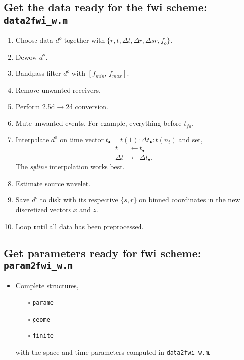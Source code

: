 \documentclass[a4paper,12pt]{article}
\begin{document}
\subsection*{Get the data ready for the fwi scheme: \texttt{data2fwi\_w.m}}
\begin{enumerate}
\item Choose data $d^o$ together with $\{r,t,\Delta t,\Delta r,\Delta sr, f_o\}$.
\item Dewow $d^o$.
\item Bandpass filter $d^o$ with $[f_{min},\, f_{max}]$.
\item Remove unwanted receivers.
\item Perform 2.5d$\to$2d conversion.
\item Mute unwanted events. For example, everything before $t_{fa}$.
\item Interpolate $d^o$ on time vector $t_\bullet=t(1):\Delta t_\bullet:t(n_t)$ and set,
\begin{align}
t &\gets t_\bullet \\
 \Delta t &\gets \Delta t_\bullet.
\end{align}
The {\it spline} interpolation works best.
\item Estimate source wavelet.
\item Save $d^o$ to disk with its respective $\{s,r\}$ on binned coordinates in the new discretized vectors $x$ and $z$.
\item Loop until all data has been preprocessed.
\end{enumerate}
%
\subsection*{Get parameters ready for fwi scheme: \texttt{param2fwi\_w.m}}
\begin{itemize}
\item Complete structures,
\begin{itemize}
\item[$\circ$] \texttt{parame\_}
\item[$\circ$] \texttt{geome\_}
\item[$\circ$] \texttt{finite\_}
\end{itemize}
with the space and time parameters computed in \texttt{data2fwi\_w.m}.
\end{itemize}
%
\end{document}
